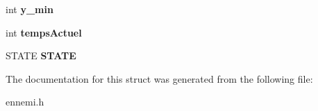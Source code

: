 \begin{DoxyCompactItemize}
\item 
int {\bfseries y\+\_\+min}\hypertarget{structEnnemi_a3bde50137cb5ec09f96e2b91546c8f4f}{}\label{structEnnemi_a3bde50137cb5ec09f96e2b91546c8f4f}

\item 
int {\bfseries temps\+Actuel}\hypertarget{structEnnemi_a30695691f611dc8bc64be42df6f23b40}{}\label{structEnnemi_a30695691f611dc8bc64be42df6f23b40}

\item 
S\+T\+A\+TE {\bfseries S\+T\+A\+TE}\hypertarget{structEnnemi_af7eb8b35fa49b1edf2404debf6273d93}{}\label{structEnnemi_af7eb8b35fa49b1edf2404debf6273d93}

\end{DoxyCompactItemize}


The documentation for this struct was generated from the following file\+:\begin{DoxyCompactItemize}
\item 
ennemi.\+h\end{DoxyCompactItemize}
